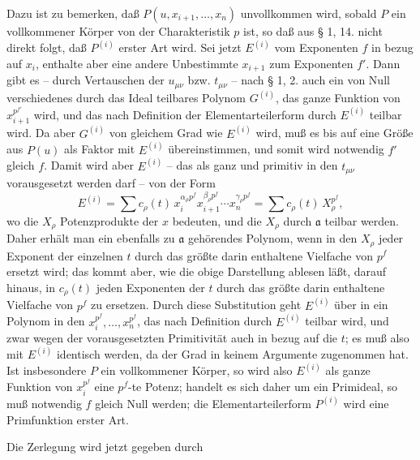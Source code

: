 \documentclass[11pt]{article}
\providecommand{\fraka}{\mathfrak a}
\begin{document}
Dazu ist zu bemerken, daß $P(u,x_{i+1},\ldots,x_n)$ unvollkommen wird, sobald $P$ ein vollkommener Körper von der Charakteristik $p$ ist, so daß aus § 1, 14. nicht direkt folgt, daß $P^{(i)}$ erster Art wird. Sei jetzt $E^{(i)}$ vom Exponenten $f$ in bezug auf $x_i$, enthalte aber eine andere Unbestimmte $x_{i+1}$ zum Exponenten $f'$. Dann gibt es -- durch Vertauschen der $u_{\mu\nu}$ bzw. $t_{\mu\nu}$ -- nach § 1, 2. auch ein von Null verschiedenes durch das Ideal teilbares Polynom $G^{(i)}$, das ganze Funktion von $x_{i+1}^{p^{f'}}$ wird, und das nach Definition der Elementarteilerform durch $E^{(i)}$ teilbar wird. Da aber $G^{(i)}$ von gleichem Grad wie $E^{(i)}$ wird, muß es bis auf eine Größe aus $P(u)$ als Faktor mit $E^{(i)}$ übereinstimmen, und somit wird notwendig $f'$ gleich $f$. Damit wird aber $E^{(i)}$ -- das als ganz und primitiv in den $t_{\mu\nu}$ vorausgesetzt werden darf -- von der Form
\[
 E^{(i)}=\sum c_\rho(t)\,x_i^{\alpha_\rho p^f}x_{i+1}^{\beta_\rho p^f}\cdots x_n^{\gamma_\rho p^f}
       =\sum c_\rho(t)\,X_\rho^{p^f},
\]
wo die $X_\rho$ Potenzprodukte der $x$ bedeuten, und die $X_\rho$ durch $\fraka$ teilbar werden. Daher erhält man ein ebenfalls zu $\fraka$ gehörendes Polynom, wenn in den $X_\rho$ jeder Exponent der einzelnen $t$ durch das größte darin enthaltene Vielfache von $p^f$ ersetzt wird; das kommt aber, wie die obige Darstellung ablesen läßt, darauf hinaus, in $c_\rho(t)$ jeden Exponenten der $t$ durch das größte darin enthaltene Vielfache von $p^f$ zu ersetzen. Durch diese Substitution geht $E^{(i)}$ über in ein Polynom in den $x_i^{p^f},\ldots,x_n^{p^f}$, das nach Definition durch $E^{(i)}$ teilbar wird, und zwar wegen der vorausgesetzten Primitivität auch in bezug auf die $t$; es muß also mit $E^{(i)}$ identisch werden, da der Grad in keinem Argumente zugenommen hat. Ist insbesondere $P$ ein vollkommener Körper, so wird also $E^{(i)}$ als ganze Funktion von $x_i^{p^f}$ eine $p^f$-te Potenz; handelt es sich daher um ein Primideal, so muß notwendig $f$ gleich Null werden; die Elementarteilerform $P^{(i)}$ wird eine Primfunktion erster Art.

Die Zerlegung wird jetzt gegeben durch
\end{document}
